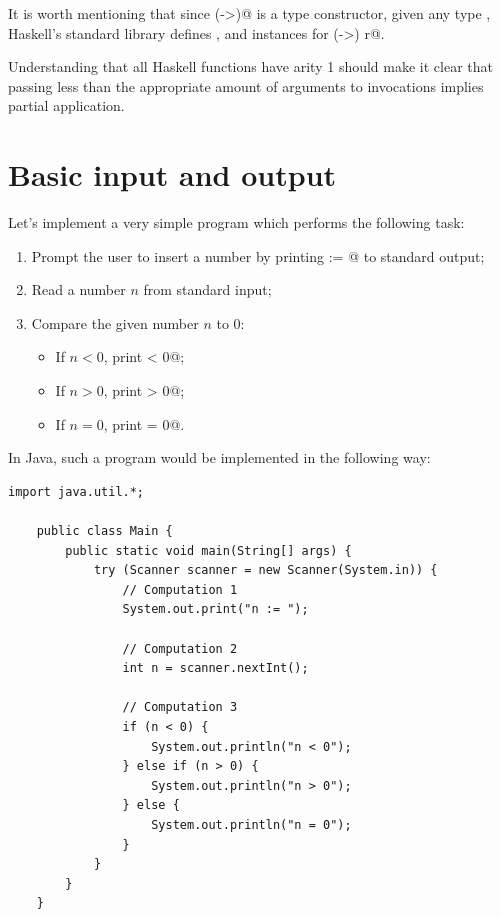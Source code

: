 \documentclass[UdineBachThesis,american,11pt]{PhdThesis}
\begin{document}
  It is worth mentioning that since \lstinline@(->)@ is a type constructor,
  given any type \lstinline@r@, Haskell's standard library defines
  \lstinline@Functor@, \lstinline@Applicative@ and \lstinline@Monad@ instances
  for \lstinline@(->) r@.

  Understanding that all Haskell functions have arity 1 should make it clear
  that passing less than the appropriate amount of arguments to invocations
  implies partial application.

  \newpage

  \section{Basic input and output}

  Let's implement a very simple program which performs the following task:

  \begin{enumerate}
    \item Prompt the user to insert a number by printing \lstinline@n := @ to
    standard output;

    \item Read a number $n$ from standard input;

    \item Compare the given number $n$ to $0$:
    \begin{itemize}[noitemsep]
      \item If $n < 0$, print \lstinline@n < 0@;
      \item If $n > 0$, print \lstinline@n > 0@;
      \item If $n = 0$, print \lstinline@n = 0@.
    \end{itemize}
  \end{enumerate}

  In Java, such a program would be implemented in the following way:

  \begin{lstlisting}[gobble=4,basicstyle=\ttfamily\small]
    import java.util.*;

    public class Main {
        public static void main(String[] args) {
            try (Scanner scanner = new Scanner(System.in)) {
                // Computation 1
                System.out.print("n := ");

                // Computation 2
                int n = scanner.nextInt();

                // Computation 3
                if (n < 0) {
                    System.out.println("n < 0");
                } else if (n > 0) {
                    System.out.println("n > 0");
                } else {
                    System.out.println("n = 0");
                }
            }
        }
    }
  \end{lstlisting}
\end{document}
